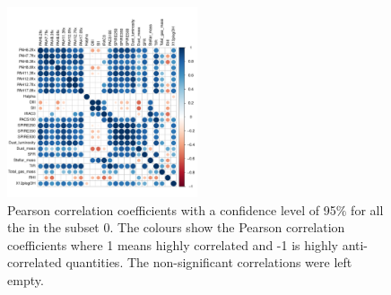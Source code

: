      
      \begin{figure}
                \centering
                \includegraphics[width=0.5\textwidth]{../images0.01/cor_plots/M31_all_derived_ones_core_plot_for_paper.pdf}
            \caption{Pearson correlation coefficients with a confidence level of 95$\%$ for all the in the subset 0. The colours show the Pearson correlation coefficients where 1 means highly correlated and -1 is highly anti-correlated quantities. The non-significant correlations were left empty.}
            \label{fig: cor_all}
        \end{figure}
 
  